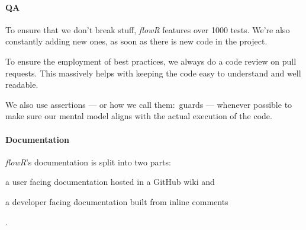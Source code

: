 \documentclass[color,coloraccent=red!60!black]{poster}
\begin{document}
\begin{multicols}{3}
	\paragraph{QA} To ensure that we don't break stuff, \textit{flowR} features over
	1000 tests. We're also constantly adding new ones, as soon as there is new code in
	the project.\par
	To ensure the employment of best practices, we always do a code review on pull
	requests. This massively helps with keeping the code easy to understand and well
	readable.\par
	We also use assertions --- or how we call them:~guards --- whenever possible to make
	sure our mental model aligns with the actual execution of the code.
	\paragraph{Documentation} \textit{flowR}'s documentation is split into two parts:
	\begin{enumerate*}
		\item a user facing documentation hosted in a GitHub wiki and
		\item a developer facing documentation built from inline comments
	\end{enumerate*}. %
\end{multicols}
\end{document}
